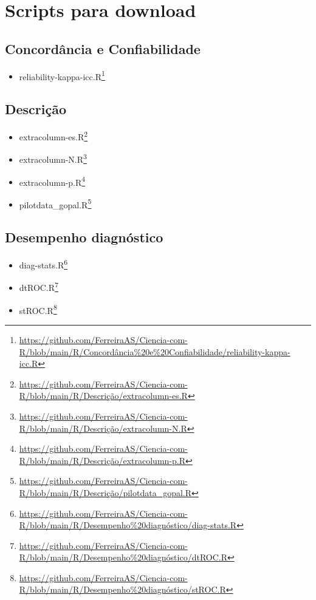 \documentclass[
  a4paper,
]{book}
\providecommand{\tightlist}{%
  \setlength{\itemsep}{0pt}\setlength{\parskip}{0pt}}
\renewcommand{\href}[2]{#2\footnote{\url{#1}}}
\begin{document}
\hypertarget{scripts-para-download}{%
\chapter{\texorpdfstring{\textbf{Scripts para download}}{Scripts para download}}\label{scripts-para-download}}

\hypertarget{concordancia-e-confiabilidade}{%
\section{Concordância e Confiabilidade}\label{concordancia-e-confiabilidade}}

\begin{itemize}
\tightlist
\item
  \href{https://github.com/FerreiraAS/Ciencia-com-R/blob/main/R/Concordância\%20e\%20Confiabilidade/reliability-kappa-icc.R}{reliability-kappa-icc.R}
\end{itemize}

\hypertarget{descricao}{%
\section{Descrição}\label{descricao}}

\begin{itemize}
\item
  \href{https://github.com/FerreiraAS/Ciencia-com-R/blob/main/R/Descrição/extracolumn-es.R}{extracolumn-es.R}
\item
  \href{https://github.com/FerreiraAS/Ciencia-com-R/blob/main/R/Descrição/extracolumn-N.R}{extracolumn-N.R}
\item
  \href{https://github.com/FerreiraAS/Ciencia-com-R/blob/main/R/Descrição/extracolumn-p.R}{extracolumn-p.R}
\item
  \href{https://github.com/FerreiraAS/Ciencia-com-R/blob/main/R/Descrição/pilotdata_gopal.R}{pilotdata\_gopal.R}
\end{itemize}

\hypertarget{desempenho-diagnostico}{%
\section{Desempenho diagnóstico}\label{desempenho-diagnostico}}

\begin{itemize}
\item
  \href{https://github.com/FerreiraAS/Ciencia-com-R/blob/main/R/Desempenho\%20diagnóstico/diag-stats.R}{diag-stats.R}
\item
  \href{https://github.com/FerreiraAS/Ciencia-com-R/blob/main/R/Desempenho\%20diagnóstico/dtROC.R}{dtROC.R}
\item
  \href{https://github.com/FerreiraAS/Ciencia-com-R/blob/main/R/Desempenho\%20diagnóstico/stROC.R}{stROC.R}
\end{itemize}
\end{document}
